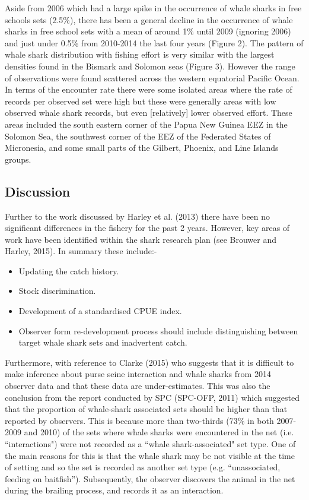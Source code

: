 \documentclass[12pt]{SCreport}
\begin{document}
Aside from 2006 which had a large spike in the occurrence of whale sharks in free schools sets (2.5\%), there has been a general decline in the occurrence of whale sharks in free school sets with a mean of around 1\%  until 2009 (ignoring 2006) and just under 0.5\% from 2010-2014 the last four years (Figure 2).  The pattern of whale shark distribution with fishing effort is very similar with the largest densities found in the Bismark and Solomon seas (Figure 3). However the range of observations were found scattered across the western equatorial Pacific Ocean. In terms of the encounter rate there were some isolated areas where the rate of records per observed set were high but these were generally areas with low observed whale shark records, but even [relatively] lower observed effort. These areas included the south eastern corner of the Papua New Guinea EEZ in the Solomon Sea, the southwest corner of the EEZ of the Federated States of Micronesia, and some small parts of the Gilbert, Phoenix, and Line Islands groups.
  
\subsection{Discussion}  
Further to the work discussed by Harley et al. (2013) there have been no significant differences in the fishery for the past 2 years.  However, key areas of work have been identified within the shark research plan (see Brouwer and Harley, 2015).  In summary these include:-

\begin{itemize}
\item{} Updating the catch history.
\item{} Stock discrimination.
\item{} Development of a standardised CPUE index.
\item{} Observer form re-development process should include distinguishing between target whale shark sets and inadvertent catch.
\end{itemize}

Furthermore, with reference to Clarke (2015) who suggests that it is difficult to make inference about purse seine interaction and whale sharks from 2014 observer data and that these data are under-estimates.  This was also the conclusion from the report conducted by SPC (SPC-OFP, 2011) which suggested that the proportion of whale-shark associated sets should be higher than that reported by observers. This is because more than two-thirds (73\% in both 2007-2009 and 2010) of the sets where whale sharks were encountered in the net (i.e. ``interactions") were not recorded as a ``whale shark-associated" set type.  One of the main reasons for this is that the whale shark may be not visible at the time of setting and so the set is recorded as another set type (e.g. ``unassociated, feeding on baitfish''). Subsequently, the observer discovers the animal in the net during the brailing process, and records it as an interaction. 
\end{document}
